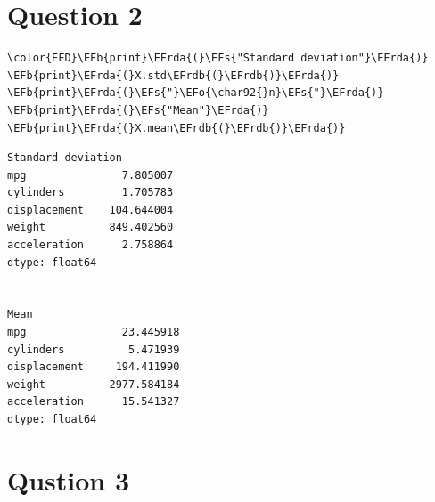 \documentclass[11pt]{article}
\newcommand{\EFs}[1]{\textcolor{EFs}{#1}} %
\newcommand{\EFb}[1]{\textcolor{EFb}{#1}} %
\newcommand{\EFo}[1]{\textcolor{EFo}{#1}} %
\newcommand{\EFrda}[1]{\textcolor{EFrda}{#1}} %
\newcommand{\EFrdb}[1]{\textcolor{EFrdb}{#1}} %
\begin{document}
\section*{Question 2}
\label{sec:orgf54ac04}



\begin{Code}
\begin{Verbatim}
\color{EFD}\EFb{print}\EFrda{(}\EFs{"Standard deviation"}\EFrda{)}
\EFb{print}\EFrda{(}X.std\EFrdb{(}\EFrdb{)}\EFrda{)}
\EFb{print}\EFrda{(}\EFs{"}\EFo{\char92{}n}\EFs{"}\EFrda{)}
\EFb{print}\EFrda{(}\EFs{"Mean"}\EFrda{)}
\EFb{print}\EFrda{(}X.mean\EFrdb{(}\EFrdb{)}\EFrda{)}
\end{Verbatim}
\end{Code}

\begin{verbatim}
Standard deviation
mpg               7.805007
cylinders         1.705783
displacement    104.644004
weight          849.402560
acceleration      2.758864
dtype: float64


Mean
mpg               23.445918
cylinders          5.471939
displacement     194.411990
weight          2977.584184
acceleration      15.541327
dtype: float64
\end{verbatim}

\section*{Qustion 3}
\label{sec:org5f38fec}
\end{document}
